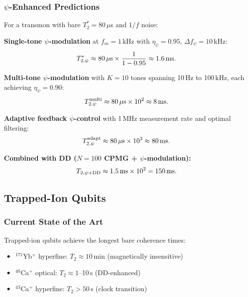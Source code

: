 \documentclass[aps,prd,twocolumn,superscriptaddress,nofootinbib]{revtex4-2}
\begin{document}
\subsubsection{$\psi$-Enhanced Predictions}

For a transmon with bare $T_2^* = 80\,\mu$s and $1/f$ noise:

\textbf{Single-tone $\psi$-modulation} at $f_m = 1$\,kHz with
$\eta_\psi = 0.95$, $\Delta f_\psi = 10$\,kHz:
\begin{equation}
T_{2,\psi}^* \approx 80\,\mu{\rm s} \times \frac{1}{1 - 0.95}
\approx 1.6\,{\rm ms}.
\end{equation}

\textbf{Multi-tone $\psi$-modulation} with $K = 10$ tones spanning
10\,Hz to 100\,kHz, each achieving $\eta_\psi = 0.90$:
\begin{equation}
T_{2,\psi}^{\rm multi} \approx 80\,\mu{\rm s} \times 10^2
\approx 8\,{\rm ms}.
\end{equation}

\textbf{Adaptive feedback $\psi$-control} with 1\,MHz measurement rate
and optimal filtering:
\begin{equation}
T_{2,\psi}^{\rm adapt} \approx 80\,\mu{\rm s} \times 10^3
\approx 80\,{\rm ms}.
\end{equation}

\textbf{Combined with DD ($N = 100$ CPMG + $\psi$-modulation):}
\begin{equation}
T_{2,\psi+\rm DD} \approx 1.5\,{\rm ms} \times 10^2 = 150\,{\rm ms}.
\end{equation}

\subsection{Trapped-Ion Qubits}

\subsubsection{Current State of the Art}

Trapped-ion qubits achieve the longest bare coherence times:
\begin{itemize}
\item $^{171}$Yb$^+$ hyperfine: $T_2 \approx 10$\,min (magnetically insensitive)
\item $^{40}$Ca$^+$ optical: $T_2 \approx 1$--10\,s (DD-enhanced)
\item $^{43}$Ca$^+$ hyperfine: $T_2 > 50$\,s (clock transition)
\end{itemize}
\end{document}
